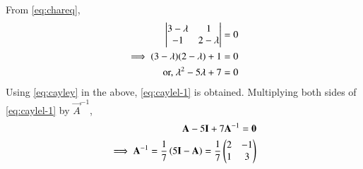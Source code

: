 From  \eqref{eq:chareq}, 
\begin{align}
 \begin{vmatrix}3-\lambda & 1 \\ -1 & 2-\lambda\end{vmatrix}&=0
\\ \implies (3-\lambda)(2-\lambda)+1&=0
	\\	\text{or, }\lambda^2-5\lambda+7&=0
\end{align}
Using  
\eqref{eq:cayley} in the above,
	\eqref{eq:caylel-1}
is obtained.
Multiplying both sides of 
	\eqref{eq:caylel-1} by $\vec{A}^{-1}$,
\begin{align}
	\mathbf{A}-5\mathbf{I}+7\mathbf{A}^{-1}=\mathbf{0}
	\\
	\implies \mathbf{A}^{-1}= \frac{1}{7}
		\left(5\mathbf{I}-\mathbf{A}\right) = \frac{1}{7}\begin{pmatrix}2 & -1 \\ 1 & 3\end{pmatrix}
\end{align}
